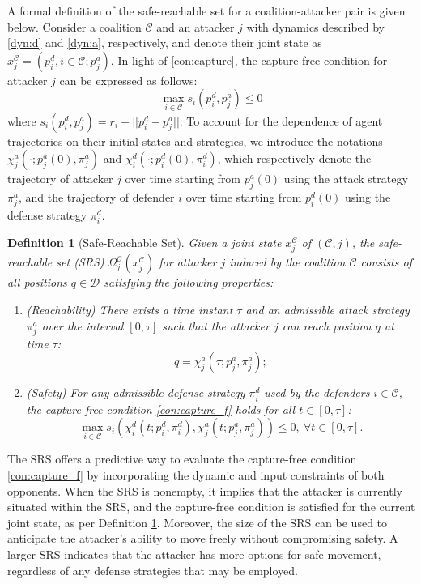 \documentclass[journal]{IEEEtran}
\newtheorem{Definition}{\bf Definition}
\newcommand{\D}{\mathcal{D}}
\newcommand{\C}{\mathcal{C}}
\newcommand{\1}{\mathbf{1}}
\begin{document}
A formal definition of the safe-reachable set for a coalition-attacker pair is given below. Consider a coalition $\C$ and an attacker $j$ with dynamics described by \eqref{dyn:d} and \eqref{dyn:a}, respectively, and denote their joint state as $x^\C_j=(p^d_i,i\in \C;p^a_j)$. In light of \eqref{con:capture}, the capture-free condition for attacker $j$ can be expressed as follows:
\begin{equation}\label{con:capture_f}
    \max_{i\in \C}s_i(p^d_i,p^a_j)\leq 0
\end{equation}
where $s_i(p^d_i,p^a_j)=r_i-||p^d_i-p^a_j||$. To account for the dependence of agent trajectories on their initial states and strategies, we introduce the notations $\chi^a_j(\cdot;p^a_j(0),\pi^a_j)$ and $\chi^d_i(\cdot;p^d_i(0),\pi^d_i)$, which respectively denote the trajectory of attacker $j$ over time starting from $p^a_j(0)$ using the attack strategy $\pi^a_j$, and the trajectory of defender $i$ over time starting from $p^d_i(0)$ using the defense strategy $\pi^d_i$.

\begin{Definition}[Safe-Reachable Set]\label{def:srs}
Given a joint state $x^\C_j$ of $(\C,j)$, the \textit{safe-reachable set} (SRS) $\Omega^\C_j(x^\C_j)$ for attacker $j$ induced by the coalition $\C$ consists of all positions $q\in \D$ satisfying the following properties:
\begin{enumerate}
    \item (Reachability) There exists a time instant $\tau$ and an admissible attack strategy $\pi^a_j$ over the interval $[0,\tau]$ such that the attacker $j$ can reach position $q$ at time $\tau$:
    \begin{equation*}
    	q=\chi^a_j(\tau;p^a_j,\pi^a_j);
	\end{equation*}
    \item (Safety) For any admissible defense strategy $\pi^d_i$ used by the defenders $i\in \C$, the capture-free condition \eqref{con:capture_f} holds for all $t\in [0,\tau]$:
    \begin{equation*}
    	\max_{i\in \C}s_i(\chi_i^d(t;p^d_i,\pi^d_i),\chi^a_j(t;p^a_j,\pi^a_j))\leq 0,~\forall t\in [0,\tau].
	\end{equation*}
\end{enumerate}
\end{Definition}

The SRS offers a predictive way to evaluate the capture-free condition \eqref{con:capture_f} by incorporating the dynamic and input constraints of both opponents. When the SRS is nonempty, it implies that the attacker is currently situated within the SRS, and the capture-free condition is satisfied for the current joint state, as per Definition \ref{def:srs}. Moreover, the size of the SRS can be used to anticipate the attacker's ability to move freely without compromising safety. A larger SRS indicates that the attacker has more options for safe movement, regardless of any defense strategies that may be employed. 
\end{document}
